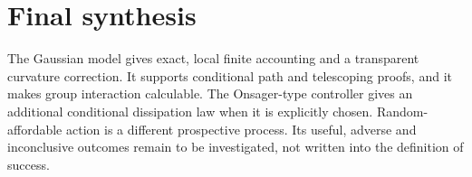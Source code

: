 \section*{Final synthesis}
The Gaussian model gives exact, local finite accounting and a transparent
curvature correction. It supports conditional path and telescoping proofs,
and it makes group interaction calculable. The Onsager-type controller gives
an additional conditional dissipation law when it is explicitly chosen.
Random-affordable action is a different prospective process. Its useful,
adverse and inconclusive outcomes remain to be investigated, not written
into the definition of success.
